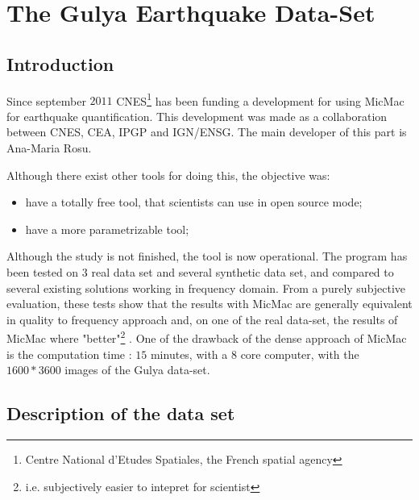 


\section{The Gulya Earthquake Data-Set}

\label{Gulya}

\subsection{Introduction}

Since september $2011$ CNES\footnote{Centre National d'Etudes Spatiales, the French spatial agency}
has been funding a development for using MicMac for  earthquake quantification. This development
was made as a collaboration between CNES, CEA, IPGP and IGN/ENSG. The main developer of this part
is Ana-Maria Rosu.

Although there exist other tools for doing this, the objective was:

\begin{itemize}
   \item have a totally free tool, that scientists can use in open source mode;
   \item have a more parametrizable tool;
\end{itemize}

Although the study is not finished, the tool  is now operational. The program has been
tested on $3$ real data set and several synthetic data set, and compared to several existing solutions 
working in frequency domain. From a purely subjective evaluation, these tests show that the
results with MicMac are generally equivalent in quality to frequency approach and, on one of the
real data-set, the results of MicMac where "better"\footnote{i.e. subjectively easier to intepret
for scientist} . One of the drawback of the dense approach of
MicMac is the computation time : $15$ minutes, with a $8$ core computer, with the $1600*3600$
images of the Gulya data-set.



\subsection{Description of the data set}

